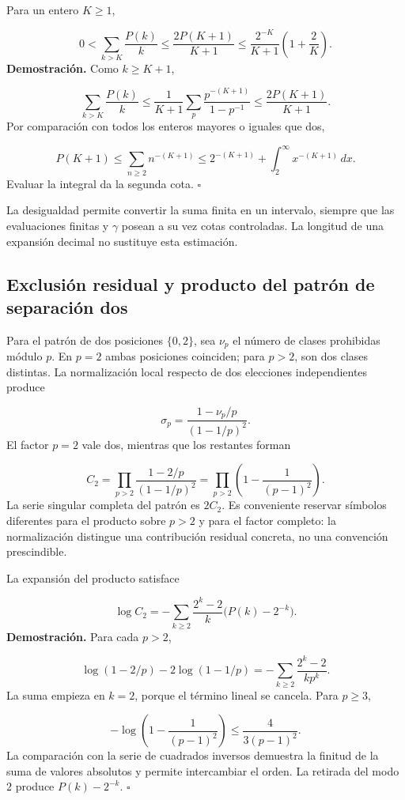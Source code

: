 Para un entero $K\ge1$,

\[
0<\sum_{k>K}\frac{P(k)}k
\le\frac{2P(K+1)}{K+1}
\le\frac{2^{-K}}{K+1}\left(1+\frac2K\right).
\]
\textbf{Demostración.} Como $k\ge K+1$,

\[
\sum_{k>K}\frac{P(k)}k
\le\frac1{K+1}\sum_p\frac{p^{-(K+1)}}{1-p^{-1}}
\le\frac{2P(K+1)}{K+1}.
\]
Por comparación con todos los enteros mayores o iguales que dos,

\[
P(K+1)\le\sum_{n\ge2}n^{-(K+1)}
\le2^{-(K+1)}+\int_2^\infty x^{-(K+1)}\,dx.
\]
Evaluar la integral da la segunda cota. \hfill\(\square\)

La desigualdad permite convertir la suma finita en un intervalo, siempre que las evaluaciones finitas y $\gamma$ posean a su vez cotas controladas. La longitud de una expansión decimal no sustituye esta estimación.

\subsection{Exclusión residual y producto del patrón de separación dos}
Para el patrón de dos posiciones \(\{0,2\}\), sea $\nu_p$ el número de clases prohibidas módulo $p$. En $p=2$ ambas posiciones coinciden; para $p>2$, son dos clases distintas. La normalización local respecto de dos elecciones independientes produce

\[
\sigma_p=\frac{1-\nu_p/p}{(1-1/p)^2}.
\]
El factor $p=2$ vale dos, mientras que los restantes forman

\[
C_2=\prod_{p>2}\frac{1-2/p}{(1-1/p)^2}
=\prod_{p>2}\left(1-\frac1{(p-1)^2}\right).
\]
La serie singular completa del patrón es $2C_2$. Es conveniente reservar símbolos diferentes para el producto sobre $p>2$ y para el factor completo: la normalización distingue una contribución residual concreta, no una convención prescindible.

La expansión del producto satisface

\[
\log C_2=-\sum_{k\ge2}\frac{2^k-2}{k}\bigl(P(k)-2^{-k}\bigr).
\]
\textbf{Demostración.} Para cada $p>2$,

\[
\log(1-2/p)-2\log(1-1/p)
=-\sum_{k\ge2}\frac{2^k-2}{kp^k}.
\]
La suma empieza en $k=2$, porque el término lineal se cancela. Para \(p\ge3\),

\[
-\log\left(1-\frac1{(p-1)^2}\right)\le\frac4{3(p-1)^2}.
\]
La comparación con la serie de cuadrados inversos demuestra la finitud de la suma de valores absolutos y permite intercambiar el orden. La retirada del modo $2$ produce $P(k)-2^{-k}$. \hfill\(\square\)

